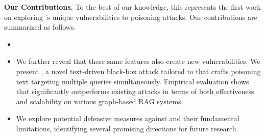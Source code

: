 \vspace{2pt}
{\bf Our Contributions.} To the best of our knowledge, this represents the first work on exploring \rag's unique vulnerabilities to poisoning attacks. Our contributions are summarized as follows.
\begin{itemize}[leftmargin=*]
\item {}
\item We further reveal that these same features also create new vulnerabilities. We present \attack, a novel text-driven black-box attack tailored to \rag that crafts poisoning text targeting multiple queries simultaneously. Empirical evaluation shows that \attack significantly outperforms existing attacks in terms of both effectiveness and scalability on various graph-based RAG systems. 
\item We explore potential defensive measures against \attack and their fundamental limitations, identifying several promising directions for future research.
\end{itemize}






